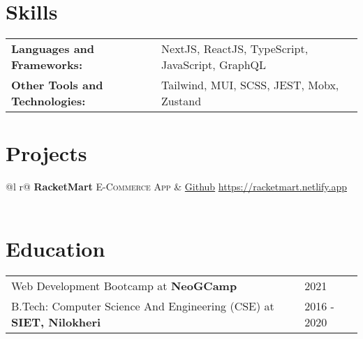 \documentclass[a4paper,12pt]{article}
\begin{document}
\section{Skills}
\begin{tabularx}{\linewidth}{@{}l X@{}}
\textbf{Languages and Frameworks:} &  \normalsize{NextJS, ReactJS, TypeScript, JavaScript, GraphQL}\\
\textbf{Other Tools and Technologies:}  &  \normalsize{Tailwind, MUI, SCSS, JEST, Mobx, Zustand}\\ 
\end{tabularx}

\section{Projects}
\begin{tabularx}{\linewidth}{ @{}l r@{} }
\textbf{RacketMart} \textsc{E-Commerce App} &  \href{https://github.com/AnkitKarnAK/racketmart-ecommerce}{Github}  \hfill \href{https://racketmart.netlify.app}{https://racketmart.netlify.app} \\[3.75pt]
  \\
\end{tabularx}

\section{Education}
\begin{tabularx}{\linewidth}{@{}l X@{}}	
Web Development Bootcamp at \textbf{NeoGCamp} & \hfill 2021 \\
B.Tech: Computer Science And Engineering (CSE) at \textbf{SIET, Nilokheri} & \hfill 2016 - 2020 \\ 
\end{tabularx}

\vfill
\end{document}
